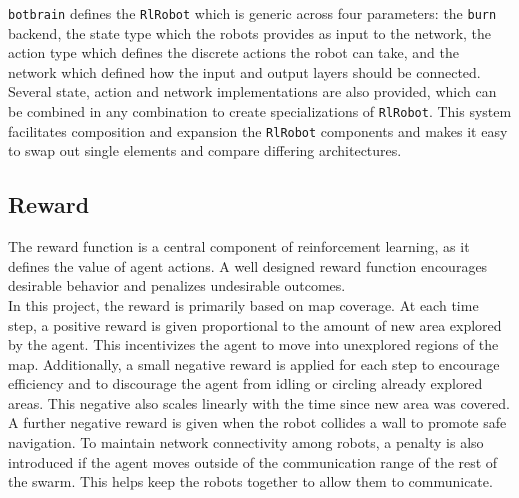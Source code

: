 \texttt{botbrain} defines the \texttt{RlRobot} which is generic across four parameters: the \texttt{burn} backend, the state type which the robots provides as input to the network, the action type which defines the discrete actions the robot can take, and the network which defined how the input and output layers should be connected. Several state, action and network implementations are also provided, which can be combined in any combination to create specializations of \texttt{RlRobot}. This system facilitates composition and expansion the \texttt{RlRobot} components and makes it easy to swap out single elements and compare differing architectures.







\subsection{Reward}
The reward function is a central component of reinforcement learning, as it defines the value of agent actions. A well designed reward function encourages desirable behavior and penalizes undesirable outcomes. \\

In this project, the reward is primarily based on map coverage. At each time step, a positive reward is given proportional to the amount of new area explored by the agent. This incentivizes the agent to move into unexplored regions of the map. Additionally, a small negative reward is applied for each step to encourage efficiency and to discourage the agent from idling or circling already explored areas. This negative also scales linearly with the time since new area was covered. A further negative reward is given when the robot collides a wall to promote safe navigation.
To maintain network connectivity among robots, a penalty is also introduced if the agent moves outside of the communication range of the rest of the swarm. This helps keep the robots together to allow them to communicate.

